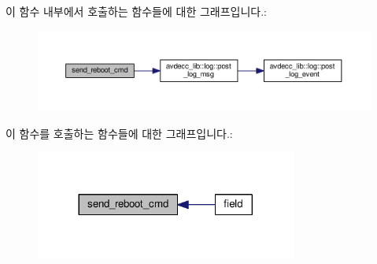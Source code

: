 이 함수 내부에서 호출하는 함수들에 대한 그래프입니다.\+:
\nopagebreak
\begin{figure}[H]
\begin{center}
\leavevmode
\includegraphics[width=350pt]{classavdecc__lib_1_1descriptor__base__imp_a7579db44e8e86da0f8f94aa4680df795_cgraph}
\end{center}
\end{figure}




이 함수를 호출하는 함수들에 대한 그래프입니다.\+:
\nopagebreak
\begin{figure}[H]
\begin{center}
\leavevmode
\includegraphics[width=245pt]{classavdecc__lib_1_1descriptor__base__imp_a7579db44e8e86da0f8f94aa4680df795_icgraph}
\end{center}
\end{figure}


